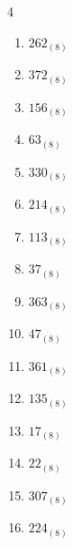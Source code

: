 \begin{multicols}{4}
\begin{enumerate}
  \item $262_{(8)}$

        \phantom{$=178$}

  \item $372_{(8)}$

        \phantom{$=250$}

  \item $156_{(8)}$

        \phantom{$=110$}

  \item $63_{(8)}$

        \phantom{$=51$}

  \item $330_{(8)}$

        \phantom{$=216$}

  \item $214_{(8)}$

        \phantom{$=140$}

  \item $113_{(8)}$

        \phantom{$=75$}

  \item $37_{(8)}$

        \phantom{$=31$}

  \item $363_{(8)}$

        \phantom{$=243$}

  \item $47_{(8)}$

        \phantom{$=39$}

  \item $361_{(8)}$

        \phantom{$=241$}

\columnbreak %

  \item $135_{(8)}$

        \phantom{$=93$}

  \item $17_{(8)}$

        \phantom{$=15$}

  \item $22_{(8)}$

        \phantom{$=18$}

  \item $307_{(8)}$

        \phantom{$=199$}

  \item $224_{(8)}$


\end{enumerate}
\end{multicols}
